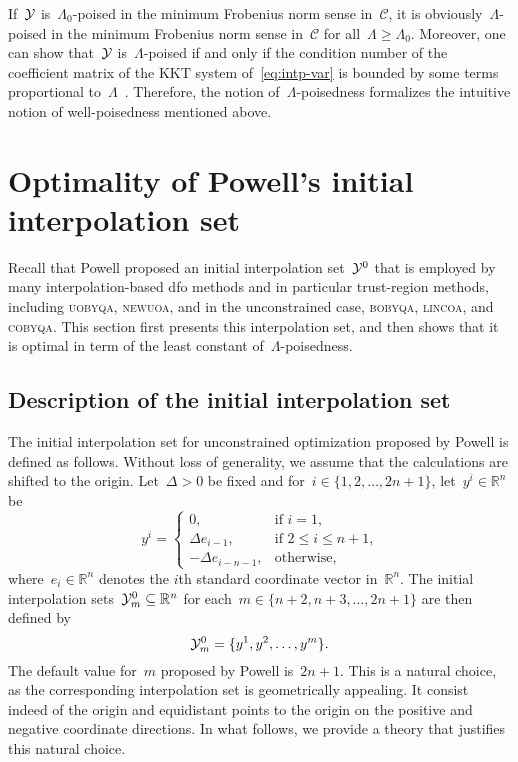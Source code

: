 \documentclass[draft]{article}
\numberwithin{equation}{section}
\theoremstyle{definition}
\theoremstyle{plain}
\newcommand{\R}{\mathbb{R}}
\newcommand{\set}[2][]{#1\{#2#1\}}
\newcommand{\solvername}[1]{\textsc{#1}\xspace}
\newcommand{\xpt}[1][]{\mathcal{Y}\ifblank{#1}{}{^{#1}}}
\begin{document}
If~$\xpt$ is~$\Lambda_0$-poised in the minimum Frobenius norm sense in~$\mathcal{C}$, it is obviously~$\Lambda$-poised in the minimum Frobenius norm sense in~$\mathcal{C}$ for all~$\Lambda \ge \Lambda_0$.
Moreover, one can show that~$\xpt$ is~$\Lambda$-poised if and only if the condition number of the coefficient matrix of the KKT system of~\eqref{eq:intp-var} is bounded by some terms proportional to~$\Lambda$~\cite[Theorem~5.8]{Conn_Scheinberg_Vicente_2009}.
Therefore, the notion of~$\Lambda$-poisedness formalizes the intuitive notion of well-poisedness mentioned above.

\section{Optimality of Powell's initial interpolation set}
\label{sec:main-result}

Recall that Powell proposed an initial interpolation set~$\xpt[0]$ that is employed by many interpolation-based \gls{dfo} methods and in particular trust-region methods, including \solvername{uobyqa}, \solvername{newuoa}, and in the unconstrained case, \solvername{bobyqa}, \solvername{lincoa}, and \solvername{cobyqa}.
This section first presents this interpolation set, and then shows that it is optimal in term of the least constant of~$\Lambda$-poisedness.

\subsection{Description of the initial interpolation set}

The initial interpolation set for unconstrained optimization proposed by Powell is defined as follows.
Without loss of generality, we assume that the calculations are shifted to the origin.
Let~$\Delta > 0$ be fixed and for~$i \in \set{1, 2, \dots, 2n + 1}$, let~$y^i \in \R^n$ be
\begin{equation}
    \label{eq:set-def}
    y^i =
    \begin{cases}
        0,                      & \text{if~$i = 1$,}\\
        \Delta e_{i - 1},       & \text{if~$2 \le i \le n + 1$,}\\
        -\Delta e_{i - n - 1},  & \text{otherwise},
    \end{cases}
\end{equation}
where~$e_i \in \R^n$ denotes the $i$th standard coordinate vector in~$\R^n$.
The initial interpolation sets~$\xpt[0]_m \subseteq \R^n$ for each~$m \in \set{n + 2, n + 3, \dots, 2n + 1}$ are then defined by
\begin{equation}
    \label{eq:set-def-m}
    \xpt[0]_m = \set{y^1, y^2, \dots, y^m}.
\end{equation}
The default value for~$m$ proposed by Powell is~$2n + 1$.
This is a natural choice, as the corresponding interpolation set is geometrically appealing.
It consist indeed of the origin and equidistant points to the origin on the positive and negative coordinate directions.
In what follows, we provide a theory that justifies this natural choice.
\end{document}
